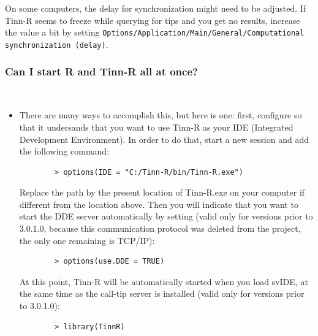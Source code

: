 On some computers, the delay for synchronization might need to be adjusted.
If Tinn-R seems to freeze while querying \RR{} for tips and you get no results,
increase the value a bit by setting
\texttt{Options/Application/Main/General/Computational synchronization (delay)}.


\subsubsection{Can I start R and Tinn-R all at once?}\\

\begin{itemize}
  \item There are many ways to accomplish this, but here is one: first,
    configure \RR{} so that it undersands that you want to use Tinn-R
    as your IDE (Integrated Development Environment). In order to do
    that, start a new \RR{} session and add the following command:

    \begin{footnotesize}
      \begin{verbatim}
        > options(IDE = "C:/Tinn-R/bin/Tinn-R.exe")
      \end{verbatim}
    \end{footnotesize}

    Replace the path by the present location of Tinn-R.exe on your computer
    if different from the location above. Then you will indicate that you
    want to start the DDE server automatically by setting (valid only for
    versions prior to 3.0.1.0, because this communication protocol
    was deleted from the project, the only one remaining is TCP/IP):

    \begin{footnotesize}
      \begin{verbatim}
        > options(use.DDE = TRUE)
      \end{verbatim}
    \end{footnotesize}


    At this point, Tinn-R will be automatically started when you load svIDE,
    at the same time as the \RR{} call-tip server is installed (valid only for
    versions prior to 3.0.1.0):

    \begin{footnotesize}
      \begin{verbatim}
        > library(TinnR)
      \end{verbatim}
    \end{footnotesize}


\end{itemize}
